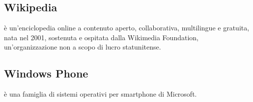 \subsection*{Wikipedia}
 è un'enciclopedia online a contenuto aperto, collaborativa, multilingue e gratuita, nata nel 2001, sostenuta e ospitata dalla Wikimedia Foundation, un'organizzazione non a scopo di lucro statunitense.

\subsection*{Windows Phone}
 è una famiglia di sistemi operativi per smartphone di Microsoft.

